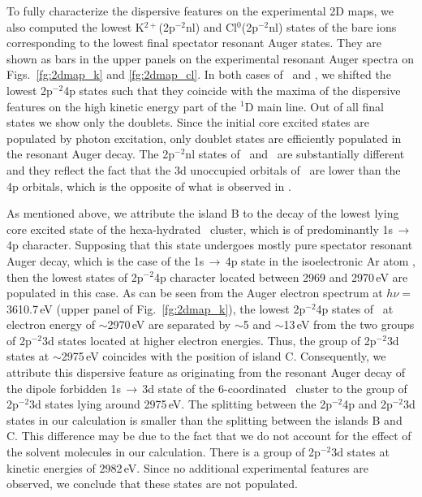 To fully characterize the dispersive features on the experimental 2D maps, we also computed the lowest K$^{2+}$(2p$^{-2}$nl) and Cl$^{0}$(2p$^{-2}$nl) states of the bare ions corresponding to the lowest final spectator resonant Auger states. They are shown as bars in the upper panels on the experimental resonant Auger spectra on Figs.\ \ref{fg:2dmap_k} and \ref{fg:2dmap_cl}. In both cases of \ki~and \cli, we shifted the lowest 2p$^{-2}$4p states such that they coincide with the maxima of the dispersive features on the high kinetic energy part of the $^1$D main line. Out of all final states we show only the doublets. Since the initial core excited states are populated by photon excitation, only doublet states are efficiently populated in the resonant Auger decay. The 2p$^{-2}$nl states of \ki~and \cli~are substantially different and they reflect the fact that the 3d unoccupied orbitals of \ki~are lower than the 4p orbitals, which is the opposite of what is observed in \cli. 


As mentioned above, we attribute the island B to the decay of the lowest lying core excited state of the hexa-hydrated \ki~cluster, which is of predominantly 1s$\,\rightarrow\,$4p character. Supposing that this state undergoes mostly pure spectator resonant Auger decay, which is the case of the 1s$\,\rightarrow\,$4p state in the isoelectronic Ar atom \citep{ceolin15:022502}, then the lowest states of 2p$^{-2}$4p character located between 2969 and 2970\,eV are populated in this case. As can be seen from the Auger electron spectrum at $h\nu = $3610.7\,eV (upper panel of Fig.\ \ref{fg:2dmap_k}), the lowest 2p$^{-2}$4p states of \ki~at electron energy of $\sim$2970\,eV are separated by $\sim$5 and $\sim$13\,eV from the two groups of 2p$^{-2}$3d states located at higher electron energies. Thus, the group of 2p$^{-2}$3d states at $\sim$2975\,eV coincides with the position of island C. Consequently, we attribute this dispersive feature as originating from the resonant Auger decay of the dipole forbidden 1s$\,\rightarrow\,$3d state of the 6-coordinated \ki~cluster to the group of 2p$^{-2}$3d states lying around 2975\,eV. The splitting between the 2p$^{-2}$4p and 2p$^{-2}$3d states in our calculation is smaller than the splitting between the islands B and C. This difference may be due to the fact that we do not account for the effect of the solvent molecules in our calculation. There is a group of 2p$^{-2}$3d states at kinetic energies of 2982\,eV. Since no additional experimental features are observed, we conclude that these states are not populated.


